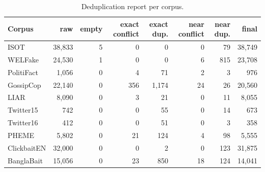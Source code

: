 \begin{table}[h]
\centering
\caption{Deduplication report per corpus.}\label{tab:supp-dedup}
\small
\begin{tabular}{@{}lrrrrrrr@{}}
\toprule
Corpus & raw & empty & exact conflict & exact dup. & near conflict & near dup. & final \\
\midrule
ISOT & 38{,}833 & 5 & 0 & 0 & 0 & 79 & 38{,}749 \\
WELFake & 24{,}530 & 1 & 0 & 0 & 6 & 815 & 23{,}708 \\
PolitiFact & 1{,}056 & 0 & 4 & 71 & 2 & 3 & 976 \\
GossipCop & 22{,}140 & 0 & 356 & 1{,}174 & 24 & 26 & 20{,}560 \\
LIAR & 8{,}090 & 0 & 3 & 21 & 0 & 11 & 8{,}055 \\
Twitter15 & 742 & 0 & 0 & 55 & 0 & 14 & 673 \\
Twitter16 & 412 & 0 & 0 & 51 & 0 & 3 & 358 \\
PHEME & 5{,}802 & 0 & 21 & 124 & 4 & 98 & 5{,}555 \\
ClickbaitEN & 32{,}000 & 0 & 0 & 2 & 0 & 123 & 31{,}875 \\
BanglaBait & 15{,}056 & 0 & 23 & 850 & 18 & 124 & 14{,}041 \\
\bottomrule
\end{tabular}
\end{table}
